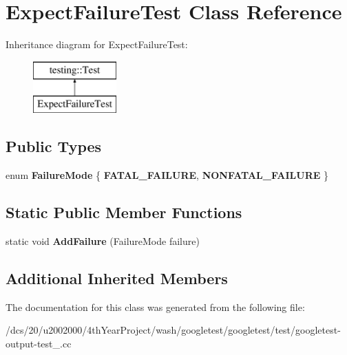 \hypertarget{classExpectFailureTest}{}\section{Expect\+Failure\+Test Class Reference}
\label{classExpectFailureTest}
Inheritance diagram for Expect\+Failure\+Test\+:\begin{figure}[H]
\begin{center}
\leavevmode
\includegraphics[height=2.000000cm]{classExpectFailureTest}
\end{center}
\end{figure}
\subsection*{Public Types}
\begin{DoxyCompactItemize}
\item 
\mbox{\label{classExpectFailureTest_aad05da10bb15d21a434eba3b37011406}} 
enum {\bfseries Failure\+Mode} \{ {\bfseries F\+A\+T\+A\+L\+\_\+\+F\+A\+I\+L\+U\+RE}, 
{\bfseries N\+O\+N\+F\+A\+T\+A\+L\+\_\+\+F\+A\+I\+L\+U\+RE}
 \}
\end{DoxyCompactItemize}
\subsection*{Static Public Member Functions}
\begin{DoxyCompactItemize}
\item 
\mbox{\label{classExpectFailureTest_ab9aeb7820ff7953fc2975ecc5abd046b}} 
static void {\bfseries Add\+Failure} (Failure\+Mode failure)
\end{DoxyCompactItemize}
\subsection*{Additional Inherited Members}


The documentation for this class was generated from the following file\+:\begin{DoxyCompactItemize}
\item 
/dcs/20/u2002000/4th\+Year\+Project/wash/googletest/googletest/test/googletest-\/output-\/test\+\_\+.\+cc\end{DoxyCompactItemize}
